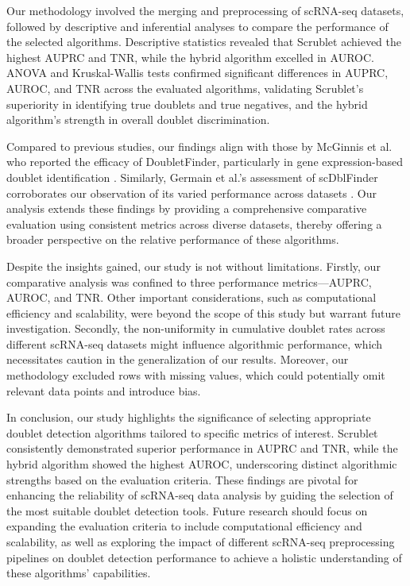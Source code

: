 \documentclass[11pt]{article}
\begin{document}
Our methodology involved the merging and preprocessing of scRNA-seq datasets, followed by descriptive and inferential analyses to compare the performance of the selected algorithms. Descriptive statistics revealed that Scrublet achieved the highest AUPRC and TNR, while the hybrid algorithm excelled in AUROC. ANOVA and Kruskal-Wallis tests confirmed significant differences in AUPRC, AUROC, and TNR across the evaluated algorithms, validating Scrublet's superiority in identifying true doublets and true negatives, and the hybrid algorithm's strength in overall doublet discrimination.

Compared to previous studies, our findings align with those by McGinnis et al. who reported the efficacy of DoubletFinder, particularly in gene expression-based doublet identification \cite{McGinnis2018DoubletFinderDD}. Similarly, Germain et al.'s assessment of scDblFinder corroborates our observation of its varied performance across datasets \cite{Germain2021DoubletII}. Our analysis extends these findings by providing a comprehensive comparative evaluation using consistent metrics across diverse datasets, thereby offering a broader perspective on the relative performance of these algorithms.

Despite the insights gained, our study is not without limitations. Firstly, our comparative analysis was confined to three performance metrics—AUPRC, AUROC, and TNR. Other important considerations, such as computational efficiency and scalability, were beyond the scope of this study but warrant future investigation. Secondly, the non-uniformity in cumulative doublet rates across different scRNA-seq datasets might influence algorithmic performance, which necessitates caution in the generalization of our results. Moreover, our methodology excluded rows with missing values, which could potentially omit relevant data points and introduce bias.

In conclusion, our study highlights the significance of selecting appropriate doublet detection algorithms tailored to specific metrics of interest. Scrublet consistently demonstrated superior performance in AUPRC and TNR, while the hybrid algorithm showed the highest AUROC, underscoring distinct algorithmic strengths based on the evaluation criteria. These findings are pivotal for enhancing the reliability of scRNA-seq data analysis by guiding the selection of the most suitable doublet detection tools. Future research should focus on expanding the evaluation criteria to include computational efficiency and scalability, as well as exploring the impact of different scRNA-seq preprocessing pipelines on doublet detection performance to achieve a holistic understanding of these algorithms’ capabilities.
\end{document}
